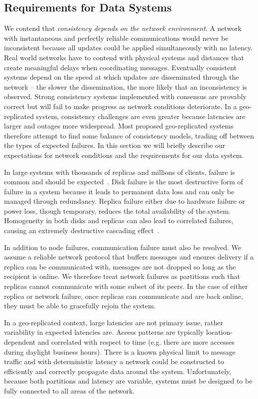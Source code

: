 \subsection{Requirements for Data Systems}

We contend that \emph{consistency depends on the network environment}.
A network with instantaneous and perfectly reliable communications would never be inconsistent because all updates could be applied simultaneously with no latency.
Real world networks have to contend with physical systems and distances that create meaningful delays when coordinating messages.
Eventually consistent systems depend on the speed at which updates are disseminated through the network -- the slower the dissemination, the more likely that an inconsistency is observed.
Strong consistency systems implemented with consensus are provably correct but will fail to make progress as network conditions deteriorate.
In a geo-replicated system, consistency challenges are even greater because latencies are larger and outages more widespread.
Most proposed geo-replicated systems~\cite{redblue,hat,wren,walter,eiger,alvaro2013consistency} therefore attempt to find some balance of consistency models, trading off between the types of expected failures.
In this section we will briefly describe our expectations for network conditions and the requirements for our data system.

In large systems with thousands of replicas and millions of clients, failure is common and should be expected~\cite{node_failure}.
Disk failure is the most destructive form of failure in a system because it leads to permanent data loss and can only be managed through redundancy.
Replica failure either due to hardware failure or power loss, though temporary, reduces the total availability of the system.
Homogeneity in both disks and replicas can also lead to correlated failures, causing an extremely destructive cascading effect~\cite{f4}.

In addition to node failures, communication failure must also be resolved.
We assume a reliable network protocol that buffers messages and ensures delivery if a replica can be communicated with, messages are not dropped so long as the recipient is online.
We therefore treat network failures as partitions such that replicas cannot communicate with some subset of its peers.
In the case of either replica or network failure, once replicas can communicate and are back online, they must be able to gracefully rejoin the system.

In a geo-replicated context, large latencies are not primary issue, rather variability in expected latencies are.
Access patterns are typically location-dependent and correlated with respect to time (e.g. there are more accesses during daylight business hours).
There is a known physical limit to message traffic and with deterministic latency a network could be constructed to efficiently and correctly propagate data around the system.
Unfortunately, because both partitions and latency are variable, systems must be designed to be fully connected to all areas of the network.


